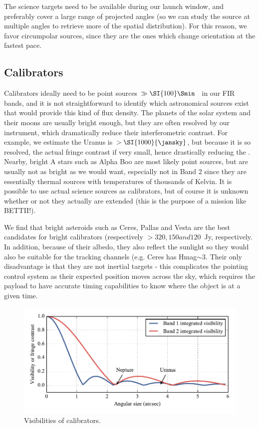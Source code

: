 The science targets need to be available during our launch window, and preferably cover a large range of projected angles (so we can study the source at multiple angles to retrieve more of the spatial distribution). For this reason, we favor circumpolar sources, since they are the ones which change orientation at the fastest pace.


\subsection{Calibrators}

Calibrators ideally need to be point sources $\gg\SI{100}\Smin$~\si{\jansky} in our FIR bands, and it is not straightforward to identify which astronomical sources exist that would provide this kind of flux density. The planets of the solar system and their moons are usually bright enough, but they are often resolved by our instrument, which dramatically reduce their interferometric contrast. For example, we estimate the Uranus is $>\SI{1000}{\jansky}$, but because it is so resolved, the actual fringe contrast if very small, hence drastically reducing the \SNR. Nearby, bright A stars such as Alpha Boo are most likely point sources, but are usually not as bright as we would want, especially not in Band 2 since they are essentially thermal sources with temperatures of thousands of Kelvin. It is possible to use actual science sources as calibrators, but of course it is unknown whether or not they actually are extended (this is the purpose of a mission like BETTII!). 

We find that bright asteroids such as Ceres, Pallas and Vesta are the best candidates for bright calibrators (respectively $> 320, 150 and 120$~Jy, respectively. In addition, because of their albedo, they also reflect the sunlight so they would also be suitable for the tracking channels (e.g. Ceres has Hmag$\sim$3. Their only disadvantage is that they are not inertial targets - this complicates the pointing control system as their expected position moves across the sky, which requires the payload to have accurate timing capabilities to know where the object is at a given time.

\begin{figure}[!h]
	\centering
	\includegraphics[width=\textwidth]{Figures/Visibilities.pdf}
	\caption[Visibilities of calibrators]{Visibilities of calibrators.}
	\label{fig:Visibilities}
    \end{figure}


